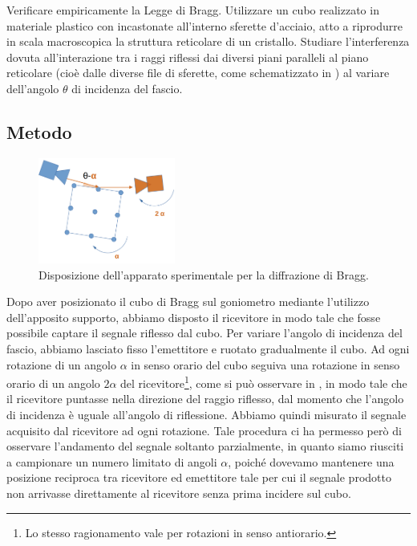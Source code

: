 \documentclass[a4paper]{article}
\begin{document}
Verificare empiricamente la Legge di Bragg. Utilizzare un cubo realizzato in materiale plastico con incastonate all'interno sferette d'acciaio, atto a riprodurre in scala macroscopica la struttura reticolare di un cristallo. Studiare l'interferenza dovuta all'interazione tra i raggi riflessi dai diversi piani paralleli al piano reticolare (cioè dalle diverse file di sferette, come schematizzato in ) al variare dell'angolo $\theta$ di incidenza del fascio.

\subsection{Metodo}
\begin{figure}[htbp]
	\centering
	\includegraphics[width=0.4\textwidth]{grafici/disposizione.bragg.png}
	\caption{Disposizione dell'apparato sperimentale per la diffrazione di Bragg.}
	\label{fig:disposizione_bragg}
\end{figure}

Dopo aver posizionato il cubo di Bragg sul goniometro mediante l'utilizzo dell'apposito supporto, abbiamo disposto il ricevitore in modo tale che fosse possibile captare il segnale riflesso dal cubo. Per variare l'angolo di incidenza del fascio, abbiamo lasciato fisso l'emettitore e ruotato gradualmente il cubo. Ad ogni rotazione di un angolo $\alpha$ in senso orario del cubo seguiva una rotazione in senso orario di un angolo $2\alpha$ del ricevitore\footnote{Lo stesso ragionamento vale per rotazioni in senso antiorario.}, come si può osservare in , in modo tale che il ricevitore puntasse nella direzione del raggio riflesso, dal momento che l'angolo di incidenza è uguale all'angolo di riflessione. Abbiamo quindi misurato il segnale acquisito dal ricevitore ad ogni rotazione. Tale procedura ci ha permesso però di osservare l'andamento del segnale soltanto parzialmente, in quanto siamo riusciti a campionare un numero limitato di angoli $\alpha$, poiché dovevamo mantenere una posizione reciproca tra ricevitore ed emettitore tale per cui il segnale prodotto non arrivasse direttamente al ricevitore senza prima incidere sul cubo.
\end{document}
